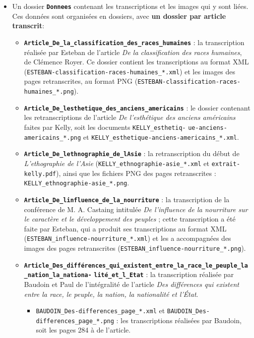\documentclass{article}
\begin{document}
	\begin{itemize}
		\item Un dossier \textbf{ \texttt{Donnees}} contenant les transcriptions et les images qui y sont liées. Ces données sont organisées en dossiers, avec \textbf{un dossier par article transcrit}:
		\begin{itemize}
			\item \textbf{\texttt{Article\_De\_la\_classification\_des\_races\_humaines}} : la transcription réalisée par Esteban de l'article \textit{De la classification des races humaines}, de Clémence Royer. Ce dossier contient les transcriptions au format XML (\texttt{ESTEBAN-classification-races-humaines\_*.xml}) et les images des pages retranscrites, au format PNG (\texttt{ESTEBAN-classification-races-humaines\_*.png}).
			\item \textbf{\texttt{Article\_De\_lesthetique\_des\_anciens\_americains}} : le dossier contenant les retranscriptions de l'article \textit{De l'esthétique des anciens américains} faites par Kelly, soit les documents \texttt{KELLY\_esthetiq-}
			\noindent  \texttt{ue-anciens-americains\_*.png} et \texttt{KELLY\_esthetique-anciens-americains\_*.xml}.
			\item \textbf{\texttt{Article\_De\_lethnographie\_de\_lAsie}} : la retranscription du début de \textit{L'ethographie de l'Asie} (\texttt{KELLY\_ethnographie-asie\_*.xml} et \texttt{extrait-kelly.pdf}), ainsi que les fichiers PNG des pages retranscrites : \texttt{KELLY\_ethnographie-asie\_*.png}.
			\item \textbf{\texttt{Article\_De\_linfluence\_de\_la\_nourriture}} : la transcription de la conférence de M. A. Castaing intitulée \textit{De l'influence de la nourriture sur le caractère et le développement des peuples} ; cette transcription a été faite par Esteban, qui a produit ses transcriptions au format XML (\texttt{ESTEBAN\_influence-nourriture\_*.xml}) et les a accompagnées des images des pages retranscrites (\texttt{ESTEBAN\_influence-nourriture\_*.png}).
			\item \textbf{\texttt{Article\_Des\_différences\_qui\_existent\_entre\_la\_race\_le\_peuple\_la\_nation\_la\_nationa-}}
			\noindent \textbf{\texttt{lité\_et\_l\_Etat}} : la transcription réalisée par Baudoin et Paul de l'intégralité de l'article \textit{Des différences qui existent entre la race, le peuple, la nation, la nationalité et l'État}.
			\begin{itemize}
				\item \texttt{BAUDOIN\_Des-differences\_page\_*.xml} et \texttt{BAUDOIN\_Des-differences\_page\_*.png} : les transcriptions réalisées par Baudoin, soit les pages 284 à de l'article.

\end{itemize}
\end{itemize}
\end{itemize}
\end{document}
